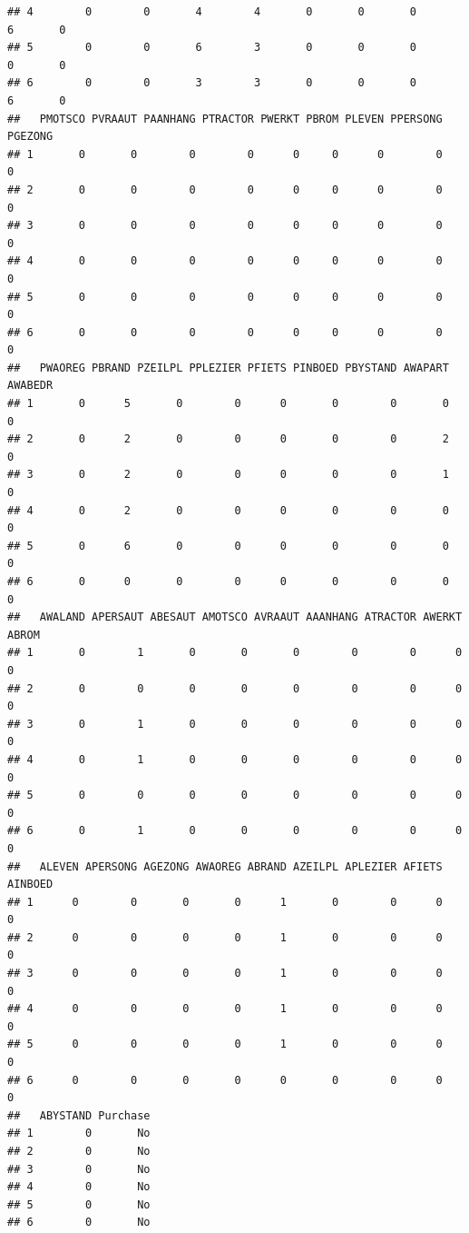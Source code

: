 \documentclass[
  12pt,
]{book}
\theoremstyle{definition}
\theoremstyle{definition}
\theoremstyle{definition}
\theoremstyle{definition}
\theoremstyle{remark}
\begin{document}
\begin{verbatim}
## 4        0        0       4        4       0       0       0        6       0
## 5        0        0       6        3       0       0       0        0       0
## 6        0        0       3        3       0       0       0        6       0
##   PMOTSCO PVRAAUT PAANHANG PTRACTOR PWERKT PBROM PLEVEN PPERSONG PGEZONG
## 1       0       0        0        0      0     0      0        0       0
## 2       0       0        0        0      0     0      0        0       0
## 3       0       0        0        0      0     0      0        0       0
## 4       0       0        0        0      0     0      0        0       0
## 5       0       0        0        0      0     0      0        0       0
## 6       0       0        0        0      0     0      0        0       0
##   PWAOREG PBRAND PZEILPL PPLEZIER PFIETS PINBOED PBYSTAND AWAPART AWABEDR
## 1       0      5       0        0      0       0        0       0       0
## 2       0      2       0        0      0       0        0       2       0
## 3       0      2       0        0      0       0        0       1       0
## 4       0      2       0        0      0       0        0       0       0
## 5       0      6       0        0      0       0        0       0       0
## 6       0      0       0        0      0       0        0       0       0
##   AWALAND APERSAUT ABESAUT AMOTSCO AVRAAUT AAANHANG ATRACTOR AWERKT ABROM
## 1       0        1       0       0       0        0        0      0     0
## 2       0        0       0       0       0        0        0      0     0
## 3       0        1       0       0       0        0        0      0     0
## 4       0        1       0       0       0        0        0      0     0
## 5       0        0       0       0       0        0        0      0     0
## 6       0        1       0       0       0        0        0      0     0
##   ALEVEN APERSONG AGEZONG AWAOREG ABRAND AZEILPL APLEZIER AFIETS AINBOED
## 1      0        0       0       0      1       0        0      0       0
## 2      0        0       0       0      1       0        0      0       0
## 3      0        0       0       0      1       0        0      0       0
## 4      0        0       0       0      1       0        0      0       0
## 5      0        0       0       0      1       0        0      0       0
## 6      0        0       0       0      0       0        0      0       0
##   ABYSTAND Purchase
## 1        0       No
## 2        0       No
## 3        0       No
## 4        0       No
## 5        0       No
## 6        0       No
\end{verbatim}
\end{document}
